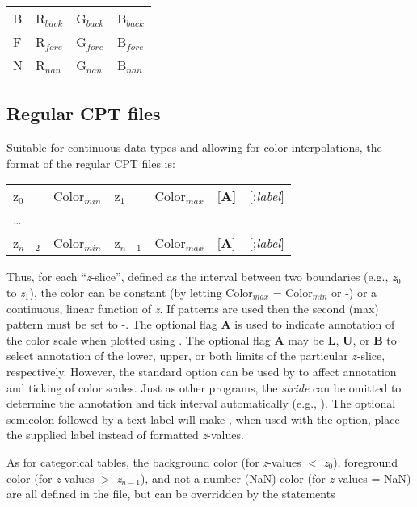 \begin{center}
\begin{tabular}{llll}
B &  R$_{back}$ &  G$_{back}$ &  B$_{back}$ \\ 
F &  R$_{fore}$ &  G$_{fore}$ &  B$_{fore}$ \\ 
N &  R$_{nan}$ &  G$_{nan}$ &  B$_{nan}$ \\
\end{tabular}
\end{center}

\subsection{Regular CPT files}

Suitable for continuous data types and allowing for color interpolations, the
format of the regular CPT files is: 

\begin{center}
\begin{tabular}{llllll}
z$_0$ &  Color$_{min}$  &  z$_1$ & Color$_{max}$ &  [\bf{A}] & [;\emph{label}] \\ 
\ldots & & & & & \\ 
z$_{n-2}$ &  Color$_{min}$ &  z$_{n-1}$ &  Color$_{max}$ &  [\textbf{A}] & [;\emph{label}] \\
\end{tabular} 
\end{center}

Thus, for each ``\emph{z}-slice'', defined as the interval between two boundaries
(e.g., \emph{z$_0$} to \emph{z$_1$}), the color can be constant (by letting Color$_{max}$
= Color$_{min}$ or -) or a continuous, linear function of \emph{z}.  If patterns are
used then the second (max) pattern must be set to -.  The optional flag \textbf{A} is used to indicate annotation
of the color scale when plotted using .  The optional flag \textbf{A} may be \textbf{L},
\textbf{U}, or \textbf{B} to select annotation of the lower, upper, or both limits
of the particular $z$-slice, respectively.  However, the standard  option can be used
by  to affect annotation and ticking of color scales. Just as other \GMT{} programs, the \emph{stride} can be omitted to determine the annotation and tick interval automatically (e.g., ).  The optional
semicolon followed by a text label will make , when used with the  option,
place the supplied label instead of formatted \emph{z}-values.

As for categorical tables, the background color (for \emph{z}-values $<$ \emph{z$_0$}), foreground color
(for \emph{z}-values $>$ \emph{z$_{n-1}$}), and not-a-number (NaN) color (for
\emph{z}-values = NaN) are all defined in the 
file, but can be overridden by the statements

